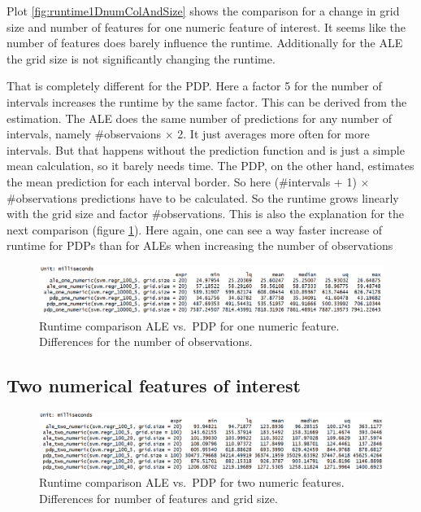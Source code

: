 \documentclass[]{krantz}
\begin{document}
Plot \ref{fig:runtime1DnumColAndSize} shows the comparison for a change
in grid size and number of features for one numeric feature of interest.
It seems like the number of features does barely influence the runtime.
Additionally for the ALE the grid size is not significantly changing the
runtime.

That is completely different for the PDP. Here a factor 5 for the number
of intervals increases the runtime by the same factor. This can be
derived from the estimation. The ALE does the same number of predictions
for any number of intervals, namely \#observaions \(\times\) 2. It just
averages more often for more intervals. But that happens without the
prediction function and is just a simple mean calculation, so it barely
needs time. The PDP, on the other hand, estimates the mean prediction
for each interval border. So here (\#intervals + 1) \(\times\)
\#observations predictions have to be calculated. So the runtime grows
linearly with the grid size and factor \#observations. This is also the
explanation for the next comparison (figure \ref{fig:runtime1DnumNrow}).
Here again, one can see a way faster increase of runtime for PDPs than
for ALEs when increasing the number of observations

\begin{figure}
\includegraphics[width=1\linewidth]{images/ale_1_one_numeric_nrows} \caption{Runtime comparison ALE vs.~PDP for one numeric
feature. Differences for the number of observations.}\label{fig:runtime1DnumNrow}
\end{figure}




\subsection{Two numerical features of
interest}\label{two-numerical-features-of-interest}

\begin{figure}
\includegraphics[width=1\linewidth]{images/ale_1_two_numeric_cols_and_gridsize} \caption{Runtime comparison ALE vs.~PDP for
two numeric features. Differences for number of features and grid size.}\label{fig:runtime2DnumColAndSize}
\end{figure}
\end{document}
